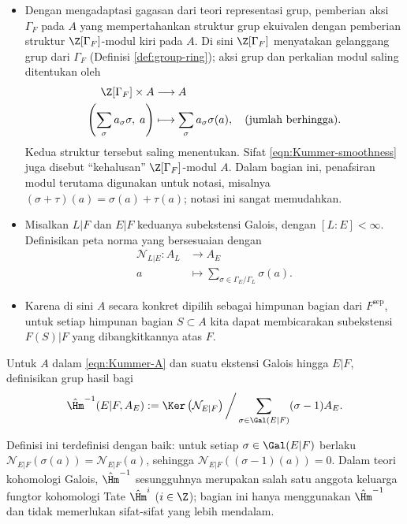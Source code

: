 \begin{itemize}
	\item Dengan mengadaptasi gagasan dari teori representasi grup, pemberian aksi $\Gamma_F$ pada $A$ yang mempertahankan struktur grup ekuivalen dengan pemberian struktur $\Z[\Gamma_F]$-modul kiri pada $A$. Di sini $\Z[\Gamma_F]$ menyatakan gelanggang grup dari $\Gamma_F$ (Definisi \ref{def:group-ring}); aksi grup dan perkalian modul saling ditentukan oleh
	\begin{align*}
		\Z[\Gamma_F] \times A & \longrightarrow A \\
		\left( \sum_\sigma a_\sigma \sigma, \; a \right) & \longmapsto \sum_\sigma a_\sigma \sigma(a), \quad \text{(jumlah berhingga)}.
	\end{align*}
	Kedua struktur tersebut saling menentukan. Sifat \eqref{eqn:Kummer-smoothness} juga disebut ``kehalusan'' $\Z[\Gamma_F]$-modul $A$. Dalam bagian ini, penafsiran modul terutama digunakan untuk notasi, misalnya $(\sigma+\tau)(a) = \sigma(a) + \tau(a)$; notasi ini sangat memudahkan.
	\item Misalkan $L|F$ dan $E|F$ keduanya subekstensi Galois, dengan $[L:E]<\infty$. Definisikan peta norma yang bersesuaian dengan
		\begin{align*}
			\mathcal{N}_{L|E}: A_L & \longrightarrow A_E \\
			a & \longmapsto \sum_{\sigma \in \Gamma_E/\Gamma_L} \sigma(a).
		\end{align*}
	\item Karena di sini $A$ secara konkret dipilih sebagai himpunan bagian dari $F^\text{sep}$, untuk setiap himpunan bagian $S \subset A$ kita dapat membicarakan subekstensi $F(S)|F$ yang dibangkitkannya atas $F$.
\end{itemize}

\begin{definition} 
	Untuk $A$ dalam \eqref{eqn:Kummer-A} dan suatu ekstensi Galois hingga $E|F$, definisikan grup hasil bagi
	\[ \hat{\Hm}^{-1}(E|F, A_E) := \Ker\left( \mathcal{N}_{E|F}\right) \bigg/ \sum_{\sigma \in \Gal(E|F)} (\sigma-1)A_E .  \]
\end{definition}
Definisi ini terdefinisi dengan baik: untuk setiap $\sigma \in \Gal(E|F)$ berlaku $\mathcal{N}_{E|F}(\sigma(a)) = \mathcal{N}_{E|F}(a)$, sehingga $\mathcal{N}_{E|F}((\sigma-1)(a))=0$. Dalam teori kohomologi Galois, $\hat{\Hm}^{-1}$ sesungguhnya merupakan salah satu anggota keluarga fungtor kohomologi Tate $\hat{\Hm}^i$ ($i \in \Z$); bagian ini hanya menggunakan $\hat{\Hm}^{-1}$ dan tidak memerlukan sifat-sifat yang lebih mendalam.

